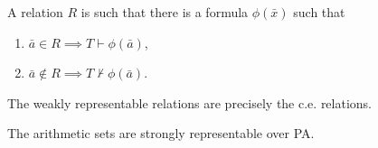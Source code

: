 \begin{definition}
  A relation $R$ is such that there is a formula $\phi(\bar{x})$ such that

  \begin{enumerate}
    \item $\bar{a}\in R \implies T\vdash \phi(\bar{a})$,
    \item $\bar{a}\not\in R \implies T\not\vdash \phi(\bar{a})$.
  \end{enumerate}
\end{definition}

\begin{fact}
  The weakly representable relations are precisely the c.e. relations.
\end{fact}

\begin{fact}
  The arithmetic sets are strongly representable over PA.
\end{fact}

